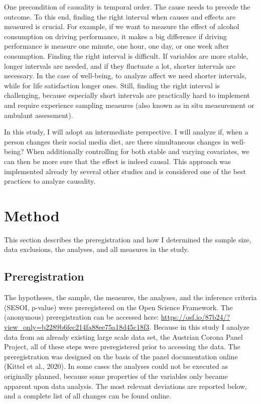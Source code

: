 \documentclass[
  english,
  man,mask,floatsintext]{apa6}
\begin{document}
One precondition of causality is temporal order.
The cause needs to precede the outcome.
To this end, finding the right interval when causes and effects are measured is crucial.
For example, if we want to measure the effect of alcohol consumption on driving performance, it makes a big difference if driving performance is measure one minute, one hour, one day, or one week after consumption.
Finding the right interval is difficult.
If variables are more stable, longer intervals are needed, and if they fluctuate a lot, shorter intervals are necessary.
In the case of well-being, to analyze affect we need shorter intervals, while for life satisfaction longer ones.
Still, finding the right interval is challenging, because especially short intervals are practically hard to implement and require experience sampling measures (also known as in situ measurement or ambulant assessment).

In this study, I will adopt an intermediate perspective.
I will analyze if, when a person changes their social media diet, are there simultaneous changes in well-being?
When additionally controlling for both stable and varying covariates, we can then be more sure that the effect is indeed causal.
This approach was implemented already by several other studies and is considered one of the best practices to analyze causality.

\hypertarget{method}{%
\section{Method}\label{method}}

This section describes the preregistration and how I determined the sample size, data exclusions, the analyses, and all measures in the study.

\hypertarget{preregistration}{%
\subsection{Preregistration}\label{preregistration}}

The hypotheses, the sample, the measures, the analyses, and the inference criteria (SESOI, p-value) were preregistered on the Open Science Framework.
The (anonymous) preregistration can be accessed here: \url{https://osf.io/87b24/?view_only=b2289b6fec214fa88ee75a18d45c18f3}.
Because in this study I analyze data from an already existing large scale data set, the Austrian Corona Panel Project, all of these steps were preregistered prior to accessing the data.
The preregistration was designed on the basis of the panel documentation online (Kittel et al., 2020).
In some cases the analyses could not be executed as originally planned, because some properties of the variables only became apparent upon data analysis.
The most relevant deviations are reported below, and a complete list of all changes can be found online.
\end{document}
